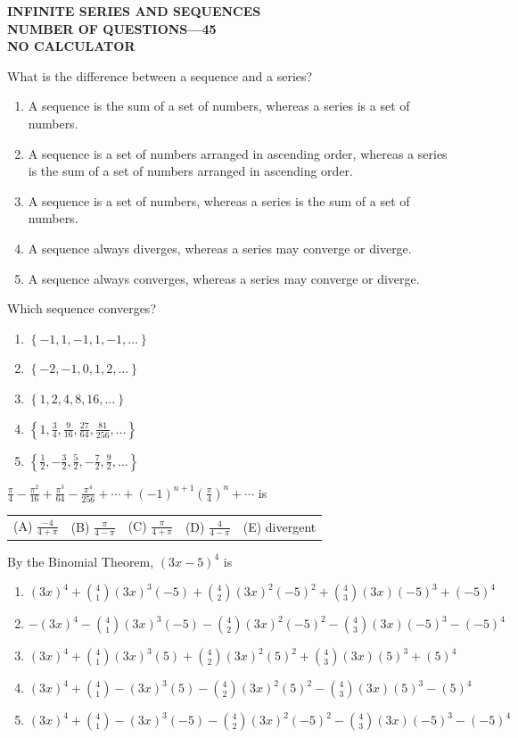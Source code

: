 \documentclass[letterstyle,12pt]{extarticle}
\newcounter{qcounter}
\newcommand{\choices}[5]{
\vspace{0.8em} 
\begin{enumerate}[label=(\Alph*)]
\setlength\itemsep{1em} 
\item
#1 
\item 
#2
\item
#3
\item
#4
\item
#5
\end{enumerate}
}
\newcommand{\choicesline}[5]{    
\vspace{2em} \break 
\begin{tabularx}{0.95 \textwidth} { 
>{\arraybackslash}X 
>{\arraybackslash}X 
>{\arraybackslash}X 
>{\arraybackslash}X 
>{\arraybackslash}X }
(A) \; #1
& 
(B) \; #2
& 
(C) \; #3
& 
(D) \; #4
&
(E) \; #5 
\end{tabularx}
\vspace{2em} \break
}
\newcommand{\ans}[1]{{\color{black} #1}}
\newenvironment{question}
    {\begin{minipage}{0.9 \textwidth}
        \item
    }
    { 
    \end{minipage} \vspace{4ex}
    }
\begin{document}
\begin{center}
    {\bf
    \MakeUppercase{Infinite Series and Sequences\\[1ex]
    NUMBER OF QUESTIONS—45 \\[1ex] 
    NO CALCULATOR \\[5ex]
    }}
\end{center}

\begin{list}{\textbf{.}~}{}
\setlength\itemsep{3em}

\begin{question}
What is the difference between a sequence and a series? 
\choices
{A sequence is the sum of a set of numbers, whereas a series is a set of numbers.}
{A sequence is a set of numbers arranged in ascending order, whereas a series is the sum of a set of numbers arranged in ascending order.}
{\ans{A sequence is a set of numbers, whereas a series is the sum of a set of numbers.} }
{A sequence always diverges, whereas a series may converge or diverge.}
{A sequence always converges, whereas a series may converge or diverge.}
\end{question}

\begin{question}
Which sequence converges?
\choices
{\(\left\{-1, 1, -1, 1, -1, \dots\right\}\)}
{\(\left\{-2, -1, 0, 1, 2, \dots\right\}\)}
{\(\left\{1, 2, 4, 8, 16, \dots\right\}\)}
{\ans{\(\left\{1, \frac{3}{4}, \frac{9}{16}, \frac{27}{64}, \frac{81}{256}, \dots \right\}\)}}
{\(\left\{\frac{1}{2}, -\frac{3}{2}, \frac{5}{2}, -\frac{7}{2}, \frac{9}{2}, \dots\right\}\)}
\end{question}



\begin{question}
\(\frac{\pi}{4} - \frac{\pi^2}{16} + \frac{\pi^3}{64} - \frac{\pi^4}{256} + \cdots + (-1)^{n + 1} \left(\frac{\pi}{4}\right)^n + \cdots\) \; is \\
\choicesline
{\(\frac{-4}{4 + \pi}\)}
{\(\frac{\pi}{4 - \pi}\)}
{\ans{\(\frac{\pi}{4 + \pi}\)}}
{\(\frac{4}{4 - \pi}\)}
{divergent}
\end{question}

\begin{question}
By the Binomial Theorem, \((3x - 5)^4\) is 
\choices
{\ans{\((3x)^4 + {4 \choose 1} (3x)^3 (-5) + {4 \choose 2} (3x)^2 (-5)^2 + {4 \choose 3} (3x) (-5)^3 + (-5)^4\)}}
{\(-(3x)^4 - {4 \choose 1} (3x)^3 (-5) - {4 \choose 2} (3x)^2 (-5)^2 - {4 \choose 3} (3x) (-5)^3 - (-5)^4\)}
{\((3x)^4 + {4 \choose 1} (3x)^3 (5) + {4 \choose 2} (3x)^2 (5)^2 + {4 \choose 3} (3x) (5)^3 + (5)^4\)}
{\((3x)^4 + {4 \choose 1} - (3x)^3 (5) - {4 \choose 2} (3x)^2 (5)^2 - {4 \choose 3} (3x) (5)^3 - (5)^4\)}
{\((3x)^4 + {4 \choose 1} - (3x)^3 (-5) - {4 \choose 2} (3x)^2 (-5)^2 - {4 \choose 3} (3x) (-5)^3 - (-5)^4\)}
\end{question}


\end{list}
\end{document}
